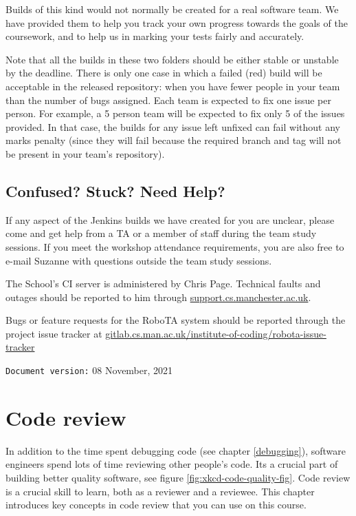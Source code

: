 \documentclass[
]{book}
\begin{document}
Builds of this kind would not normally be created for a real software team. We have provided them to help you track your own progress towards the goals of the coursework, and to help us in marking your tests fairly and accurately.

Note that all the builds in these two folders should be either stable or unstable by the deadline. There is only one case in which a failed (red) build will be acceptable in the released repository: when you have fewer people in your team than the number of bugs assigned. Each team is expected to fix one issue per person. For example, a 5 person team will be expected to fix only 5 of the issues provided. In that case, the builds for any issue left unfixed can fail without any marks penalty (since they will fail because the required branch and tag will not be present in your team's repository).

\hypertarget{confused}{%
\section{Confused? Stuck? Need Help?}\label{confused}}

If any aspect of the Jenkins builds we have created for you are unclear, please come and get help from a TA or a member of staff during the team study sessions. If you meet the workshop attendance requirements, you are also free to e-mail Suzanne with questions outside the team study sessions.

The School's CI server is administered by Chris Page. Technical faults and outages should be reported to him through \href{https://support.cs.manchester.ac.uk}{support.cs.manchester.ac.uk}.

Bugs or feature requests for the RoboTA system should be reported through the project issue tracker at \href{https://gitlab.cs.man.ac.uk/institute-of-coding/robota-issue-tracker}{gitlab.cs.man.ac.uk/institute-of-coding/robota-issue-tracker}

\texttt{Document\ version:} 08 November, 2021

\hypertarget{reviewing}{%
\chapter{Code review}\label{reviewing}}

In addition to the time spent debugging code (see chapter \ref{debugging}), software engineers spend lots of time reviewing other people's code. Its a crucial part of building better quality software, see figure \ref{fig:xkcd-code-quality-fig}. Code review is a crucial skill to learn, both as a reviewer and a reviewee. This chapter introduces key concepts in code review that you can use on this course.
\end{document}
